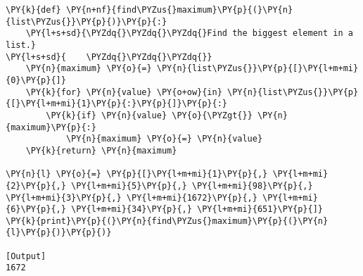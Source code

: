 \begin{Verbatim}[label=\makebox{\url{https://bitbucket.org/lbaldini/programming/src/tip/snippets/find\_max.py}},commandchars=\\\{\}]
\PY{k}{def} \PY{n+nf}{find\PYZus{}maximum}\PY{p}{(}\PY{n}{list\PYZus{}}\PY{p}{)}\PY{p}{:}
    \PY{l+s+sd}{\PYZdq{}\PYZdq{}\PYZdq{}Find the biggest element in a list.}
\PY{l+s+sd}{    \PYZdq{}\PYZdq{}\PYZdq{}}
    \PY{n}{maximum} \PY{o}{=} \PY{n}{list\PYZus{}}\PY{p}{[}\PY{l+m+mi}{0}\PY{p}{]}
    \PY{k}{for} \PY{n}{value} \PY{o+ow}{in} \PY{n}{list\PYZus{}}\PY{p}{[}\PY{l+m+mi}{1}\PY{p}{:}\PY{p}{]}\PY{p}{:}
        \PY{k}{if} \PY{n}{value} \PY{o}{\PYZgt{}} \PY{n}{maximum}\PY{p}{:}
            \PY{n}{maximum} \PY{o}{=} \PY{n}{value}
    \PY{k}{return} \PY{n}{maximum}

\PY{n}{l} \PY{o}{=} \PY{p}{[}\PY{l+m+mi}{1}\PY{p}{,} \PY{l+m+mi}{2}\PY{p}{,} \PY{l+m+mi}{5}\PY{p}{,} \PY{l+m+mi}{98}\PY{p}{,} \PY{l+m+mi}{3}\PY{p}{,} \PY{l+m+mi}{1672}\PY{p}{,} \PY{l+m+mi}{6}\PY{p}{,} \PY{l+m+mi}{34}\PY{p}{,} \PY{l+m+mi}{651}\PY{p}{]}
\PY{k}{print}\PY{p}{(}\PY{n}{find\PYZus{}maximum}\PY{p}{(}\PY{n}{l}\PY{p}{)}\PY{p}{)}

[Output]
1672
\end{Verbatim}
